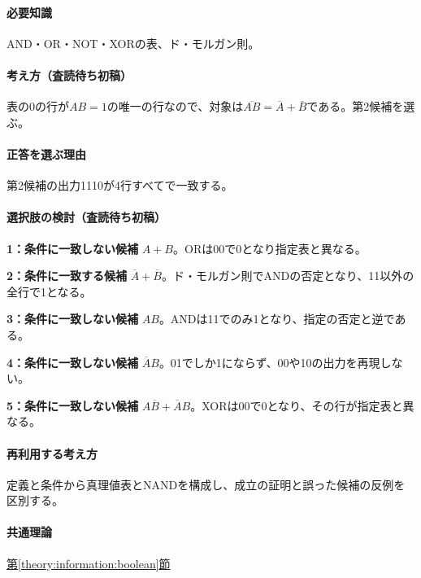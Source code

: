 \paragraph{必要知識} AND・OR・NOT・XORの表、ド・モルガン則。

\paragraph{考え方（査読待ち初稿）} 表の0の行が\(AB=1\)の唯一の行なので、対象は\(\overline{AB}=\overline A+\overline B\)である。第2候補を選ぶ。

\paragraph{正答を選ぶ理由} 第2候補の出力1110が4行すべてで一致する。

\paragraph{選択肢の検討（査読待ち初稿）}\mbox{}\par

\noindent\textbf{1：条件に一致しない候補} \(A+B\)。ORは00で0となり指定表と異なる。\par

\noindent\textbf{2：条件に一致する候補} \(\overline A+\overline B\)。ド・モルガン則でANDの否定となり、11以外の全行で1となる。\par

\noindent\textbf{3：条件に一致しない候補} \(AB\)。ANDは11でのみ1となり、指定の否定と逆である。\par

\noindent\textbf{4：条件に一致しない候補} \(\overline A B\)。01でしか1にならず、00や10の出力を再現しない。\par

\noindent\textbf{5：条件に一致しない候補} \(A\overline B+\overline A B\)。XORは00で0となり、その行が指定表と異なる。\par

\paragraph{再利用する考え方} 定義と条件から真理値表とNANDを構成し、成立の証明と誤った候補の反例を区別する。

\paragraph{共通理論} \hyperref[theory:information:boolean]{第\ref*{theory:information:boolean}節}

